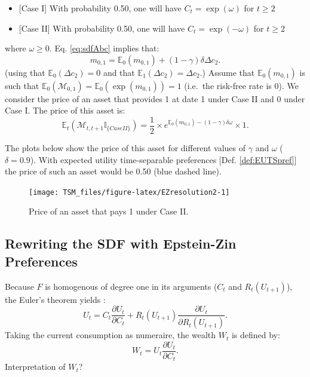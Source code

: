 \documentclass[
  12pt,
]{book}
\providecommand{\tightlist}{%
  \setlength{\itemsep}{0pt}\setlength{\parskip}{0pt}}
\theoremstyle{definition}
\theoremstyle{definition}
\theoremstyle{definition}
\theoremstyle{definition}
\theoremstyle{remark}
\begin{document}
\begin{itemize}
\tightlist
\item
  {[}Case I{]} With probability 0.50, one will have \(C_t=\exp(\omega)\) for \(t\ge2\)
\item
  {[}Case II{]} With probability 0.50, one will have \(C_t=\exp(-\omega)\) for \(t\ge2\)
\end{itemize}

where \(\omega \ge 0\).
Eq. \eqref{eq:sdfAbc} implies that:
\[
m_{0,1} = \mathbb{E}_0(m_{0,1}) + (1 - \gamma)\delta \Delta c_{2}.
\]
(using that \(\mathbb{E}_0(\Delta c_{2})=0\) and that \(\mathbb{E}_1(\Delta c_{2})=\Delta c_{2}\).)
Assume that \(\mathbb{E}_0(m_{0,1})\) is such that \(\mathbb{E}_0(\mathcal{M}_{0,1})=\mathbb{E}_0(\exp(m_{0,1}))=1\) (i.e.~the risk-free rate is 0).
We consider the price of an asset that provides 1 at date 1 under Case II and 0 under Case I.
The price of this asset is:
\[
\mathbb{E}_t(\mathcal{M}_{t,t+1}\mathbb{I}_{\{Case II\}}) = \frac{1}{2} \times e^{\mathbb{E}_0(m_{0,1}) - (1 - \gamma)\delta \omega} \times 1.
\]

The plots below show the price of this asset for different values of \(\gamma\) and \(\omega\) (\(\delta=0.9\)).
With expected utility time-separable preferences {[}Def. \ref{def:EUTSpref}{]} the price of such an asset would be 0.50 (blue dashed line).

\begin{figure}
\texttt{[image: TSM\_files/figure-latex/EZresolution2-1]} \caption{Price of an asset that pays 1 under Case II.}\label{fig:EZresolution2}
\end{figure}

\hypertarget{rewriting-the-sdf-with-epstein-zin-preferences}{%
\subsection{Rewriting the SDF with Epstein-Zin Preferences}\label{rewriting-the-sdf-with-epstein-zin-preferences}}

Because \(F\) is homogenous of degree one in its arguments (\(C_t\) and \(R_t(U_{t+1})\)), the Euler's theorem yields \citep{HANSEN20073967}:
\begin{equation}
U_t = C_t \frac{\partial U_t}{\partial C_t} +  R_t(U_{t+1}) \frac{\partial U_t}{\partial R_t(U_{t+1})}.\label{eq:XXYXX}
\end{equation}
Taking the current consumption as numeraire, the wealth \(W_t\) is defined by:
\begin{equation}
W_t =   U_t \frac{\partial U_t}{\partial C_t}.\label{eq:WWWWW}
\end{equation}
Interpretation of \(W_t\)?
\end{document}
